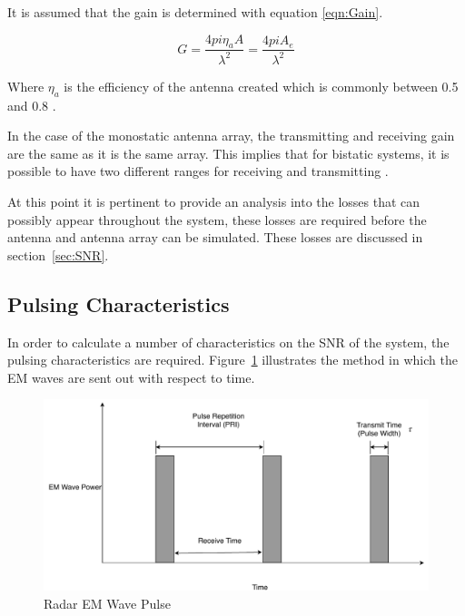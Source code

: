 \documentclass[11pt]{witseiepaper}
\begin{document}
It is assumed that the gain is determined with equation \ref{eqn:Gain}.

\begin{equation} \label{eqn:Gain}
G = \frac{4 pi \eta_{a} A}{\lambda^2} = \frac{4 pi A_{e}}{\lambda^2}
\end{equation}

Where $\eta_{a}$ is the efficiency of the antenna created which is commonly between 0.5 and 0.8 \cite[p.~64]{radarHandbook}.

In the case of the monostatic antenna array, the transmitting and receiving gain are the same as it is the same array. This implies that for bistatic systems, it is possible to have two different ranges for receiving and transmitting \cite[p.~64]{radarHandbook}.


At this point it is pertinent to provide an analysis into the losses that can possibly appear throughout the system, these losses are required before the antenna and antenna array can be simulated. These losses are discussed in section~\ref{sec:SNR}.



\subsection{Pulsing Characteristics} \label{sec:PulsingCharacteristics}
In order to calculate a number of characteristics on the SNR of the system, the pulsing characteristics are required. Figure~\ref{fig:Pulsing} illustrates the method in which the EM waves are sent out with respect to time. 

\begin{center}
    \begin{figure}
        \includegraphics[width=\textwidth]{Pulsing.pdf}
        \caption{Radar EM Wave Pulse}
        \label{fig:Pulsing}    
    \end{figure}
\end{center}
\end{document}
